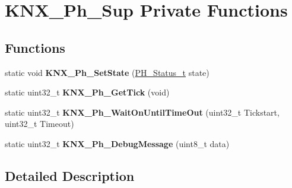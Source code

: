 \hypertarget{group___k_n_x___p_h___sup___private___functions}{}\section{K\+N\+X\+\_\+\+Ph\+\_\+\+Sup Private Functions}
\label{group___k_n_x___p_h___sup___private___functions}
\subsection*{Functions}
\begin{DoxyCompactItemize}
\item 
static void {\bfseries K\+N\+X\+\_\+\+Ph\+\_\+\+Set\+State} (\hyperlink{group___k_n_x___p_h___sup___exported___types_ga5b665a94bef912fbfbea7cc949ed0e49}{P\+H\+\_\+\+Status\+\_\+t} state)\hypertarget{group___k_n_x___p_h___sup___private___functions_ga8253bed4aa2e3d7bfa9c1de3604668e0}{}\label{group___k_n_x___p_h___sup___private___functions_ga8253bed4aa2e3d7bfa9c1de3604668e0}

\item 
static uint32\+\_\+t {\bfseries K\+N\+X\+\_\+\+Ph\+\_\+\+Get\+Tick} (void)\hypertarget{group___k_n_x___p_h___sup___private___functions_ga751f52d340ebaafe0b07f4dad46170aa}{}\label{group___k_n_x___p_h___sup___private___functions_ga751f52d340ebaafe0b07f4dad46170aa}

\item 
static uint32\+\_\+t {\bfseries K\+N\+X\+\_\+\+Ph\+\_\+\+Wait\+On\+Until\+Time\+Out} (uint32\+\_\+t Tickstart, uint32\+\_\+t Timeout)\hypertarget{group___k_n_x___p_h___sup___private___functions_ga41c5c8a01972669cc3007945505e81f9}{}\label{group___k_n_x___p_h___sup___private___functions_ga41c5c8a01972669cc3007945505e81f9}

\item 
static uint32\+\_\+t {\bfseries K\+N\+X\+\_\+\+Ph\+\_\+\+Debug\+Message} (uint8\+\_\+t data)\hypertarget{group___k_n_x___p_h___sup___private___functions_gaab2dd89c41e07570f7fd6e8e46e504b8}{}\label{group___k_n_x___p_h___sup___private___functions_gaab2dd89c41e07570f7fd6e8e46e504b8}

\end{DoxyCompactItemize}


\subsection{Detailed Description}
